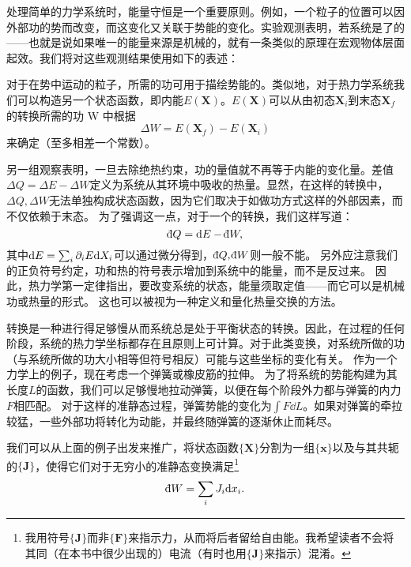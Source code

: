 	处理简单的力学系统时，能量守恒是一个重要原则。例如，一个粒子的位置可以因外部功的势而改变，而这变化又关联于势能的变化。实验观测表明，若系统是了的——也就是说如果唯一的能量来源是机械的，就有一条类似的原理在宏观物体层面起效。我们将对这些观测结果使用如下的表述：



	对于在势中运动的粒子，所需的功可用于描绘势能的。类似地，对于热力学系统我们可以构造另一个状态函数，即内能\(E(\mathbf X)\)。\(E(\mathbf X)\)可以从由初态\(\mathbf X_i\)到末态\(\mathbf X_f\)的转换所需的功 W 中根据
	\begin{equation}
		\Delta W=E(\mathbf X_f)-E(\mathbf X_i)
	\end{equation}
	来确定（至多相差一个常数）。

	另一组观察表明，一旦去除绝热约束，功的量值就不再等于内能的变化量。差值\(\Delta Q=\Delta E−\Delta W\)定义为系统从其环境中吸收的热量。显然，在这样的转换中，\(\Delta Q, \Delta W\)无法单独构成状态函数，因为它们取决于如做功方式这样的外部因素，而不仅依赖于末态。
	为了强调这一点，对于一个的转换，我们这样写道：
	\begin{equation}
		\ddbar Q=\dd E-\ddbar W,
	\end{equation}
	其中\({\mathrm d} E=\sum_i\partial_iE{\mathrm d} X_i\)可以通过微分得到，\(\ddbar Q,\ddbar W\)则一般不能。
	另外应注意我们的正负符号约定，功和热的符号表示增加到系统中的能量，而不是反过来。
	因此，热力学第一定律指出，要改变系统的状态，能量须取定值——而它可以是机械功或热量的形式。
	这也可以被视为一种定义和量化热量交换的方法。

	转换是一种进行得足够慢从而系统总是处于平衡状态的转换。因此，在过程的任何阶段，系统的热力学坐标都存在且原则上可计算。对于此类变换，对系统所做的功（与系统所做的功大小相等但符号相反）可能与这些坐标的变化有关。
	作为一个力学上的例子，现在考虑一个弹簧或橡皮筋的拉伸。
	为了将系统的势能构建为其长度$L$的函数，我们可以足够慢地拉动弹簧，以便在每个阶段外力都与弹簧的内力$F$相匹配。
	对于这样的准静态过程，弹簧势能的变化为\(\int F\dd L\)。如果对弹簧的牵拉较猛，一些外部功将转化为动能，并最终随弹簧的逐渐休止而耗尽。

	我们可以从上面的例子出发来推广，将状态函数\(\{\mathbf X\}\)分割为一组\(\{\mathbf x\}\)以及与其共轭的\(\{\mathbf J\}\)，使得它们对于无穷小的准静态变换满足\footnote{我用符号\(\{\mathbf J\}\)而非\(\{\mathbf F\}\)来指示力，从而将后者留给自由能。我希望读者不会将其同（在本书中很少出现的）电流（有时也用\(\{\mathbf J\}\)来指示）混淆。}
	\begin{equation}
		\ddbar W=\sum_iJ_i\dd x_i.
	\end{equation}

